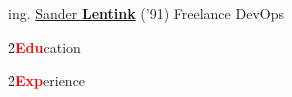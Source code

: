 \large ing.
\Huge \href{http://lent.ink}{Sander \textbf{Lentink}}
\large ('91) Freelance DevOps
\normalsize

\h{2}{\textbf{\textcolor{red}{Edu}}cation}{}


\h{2}{\textbf{\textcolor{red}{Exp}}erience}{}


